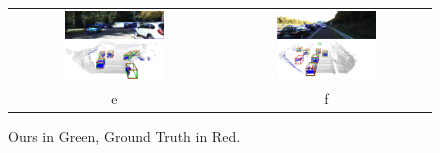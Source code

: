 \begin{figure}
\begin{tabular}{c c}
            \includegraphics[width=0.5\textwidth]{figures/Qualitative_examples/217.png}
            & 
            \includegraphics[width=0.5\textwidth]{figures/Qualitative_examples/357.png}
            \\
            e & f\\
        

         
         

 

        
    \end{tabular}
    \caption{Ours in Green, Ground Truth in Red.}
    \label{f:Qualitative_supp}
\end{figure}

